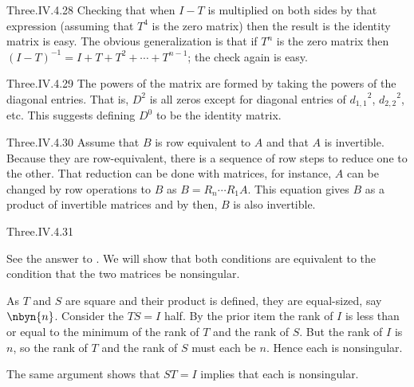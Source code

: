 \begin{ans}{Three.IV.4.28}
      Checking that when $I-T$ is multiplied on both sides by that expression
      (assuming that $T^4$ is the zero matrix) then the result is the
      identity matrix is easy.
      The obvious generalization is that if \( T^n \) is the zero matrix
      then \( (I-T)^{-1}=I+T+T^2+\cdots+T^{n-1} \); the check again is
      easy.
    
\end{ans}
\begin{ans}{Three.IV.4.29}
      The powers of the matrix are formed by taking the powers of the
      diagonal entries.
      That is,  \( D^2 \) is all zeros except for diagonal entries of
      \( {d_{1,1}}^2 \), \( {d_{2,2}}^2 \), etc.
      This suggests defining \( D^0 \) to be the identity matrix.
    
\end{ans}
\begin{ans}{Three.IV.4.30}
      Assume that $B$ is row equivalent to $A$ and that $A$ is invertible.
      Because they are row-equivalent, there is a sequence of row steps
      to reduce one to the other.
      That reduction can be done with matrices, for instance, $A$ can be
      changed by row operations to $B$ as $B=R_n\cdots R_1A$.
      This equation gives $B$ as a product of invertible matrices and
      by  then, $B$ is also invertible.
    
\end{ans}
\begin{ans}{Three.IV.4.31}
      \begin{exparts}
        \partsitem See the answer to
          .
        \partsitem We will show that both conditions are equivalent to
          the condition that the two matrices be nonsingular.

          As \( T \) and \( S \) are square and their product is defined,
          they are equal-sized, say \( \nbyn{n} \).
          Consider the \( TS=I \) half.
          By the prior item the rank of \( I \) is less than or equal to
          the minimum of the rank of \( T \) and the rank of \( S \).
          But the rank of \( I \) is \( n \), so the rank of \( T \) and
          the rank of \( S \) must each be \( n \).
          Hence each is nonsingular.

          The same argument shows that \( ST=I \) implies that
          each is nonsingular.
      \end{exparts}
    
\end{ans}
